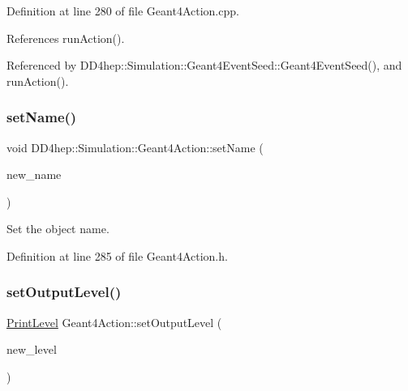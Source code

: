 Definition at line 280 of file Geant4\+Action.\+cpp.



References run\+Action().



Referenced by D\+D4hep\+::\+Simulation\+::\+Geant4\+Event\+Seed\+::\+Geant4\+Event\+Seed(), and run\+Action().

\hypertarget{class_d_d4hep_1_1_simulation_1_1_geant4_action_a88c6c831673b3c152961079507056daa}{}\label{class_d_d4hep_1_1_simulation_1_1_geant4_action_a88c6c831673b3c152961079507056daa} 
\subsubsection{\texorpdfstring{set\+Name()}{setName()}}
{\footnotesize\ttfamily void D\+D4hep\+::\+Simulation\+::\+Geant4\+Action\+::set\+Name (\begin{DoxyParamCaption}\item[{const std\+::string \&}]{new\+\_\+name }\end{DoxyParamCaption})\hspace{0.3cm}{\ttfamily [inline]}}



Set the object name. 



Definition at line 285 of file Geant4\+Action.\+h.

\hypertarget{class_d_d4hep_1_1_simulation_1_1_geant4_action_a20453f25c4556d21e25b68f140955cc3}{}\label{class_d_d4hep_1_1_simulation_1_1_geant4_action_a20453f25c4556d21e25b68f140955cc3} 
\subsubsection{\texorpdfstring{set\+Output\+Level()}{setOutputLevel()}}
{\footnotesize\ttfamily \hyperlink{namespace_d_d4hep_a5b5a64d56252469451f2020a27d57d42}{Print\+Level} Geant4\+Action\+::set\+Output\+Level (\begin{DoxyParamCaption}\item[{\hyperlink{namespace_d_d4hep_a5b5a64d56252469451f2020a27d57d42}{Print\+Level}}]{new\+\_\+level }\end{DoxyParamCaption})}



